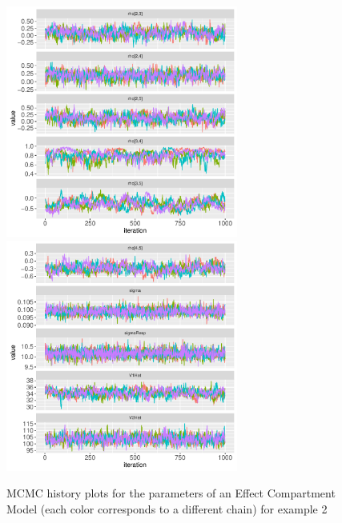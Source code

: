 \documentclass[10pt, reqno, oneside]{amsbook}
\numberwithin{equation}{chapter}
\numberwithin{figure}{chapter}
\numberwithin{table}{chapter}
\theoremstyle{remark}
\begin{document}
\begin{figure}[!htb]
  \includegraphics[width=3.0in,trim=0in 0in 0 0in]{graphics/effCptModelTorsten_0.82/effCptPlots004.pdf}
  \includegraphics[width=3.0in,trim=0in 0in 0 0in]{graphics/effCptModelTorsten_0.82/effCptPlots005.pdf}
  \caption{{MCMC history plots for the parameters of an Effect Compartment Model (each color corresponds to a different chain) for example 2}}
  \label{effCptModelMCMC}
\end{figure}
\end{document}
